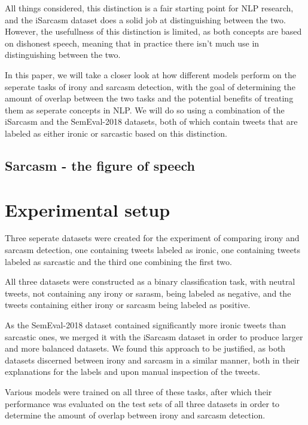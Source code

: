 \documentclass[10pt, a4paper]{article}
\begin{document}
All things considered, this distinction is a fair starting point for NLP research, and the iSarcasm \citep{iSarcasm} dataset
does a solid job at distinguishing between the two. However, the usefullness of this distinction is limited, as both concepts
are based on dishonest speech, meaning that in practice there isn't much use in distinguishing between the two.

In this paper, we will take a closer look at how different models perform on the seperate tasks of irony and sarcasm detection,
with the goal of determining the amount of overlap between the two tasks and the potential benefits of treating them as seperate
concepts in NLP. We will do so using a combination of the iSarcasm \citep{iSarcasm} and the SemEval-2018 \citep{semeval-2018} 
datasets, both of which contain tweets that are labeled as either ironic or sarcastic based on this distinction.

\subsection{Sarcasm - the figure of speech}

\section{Experimental setup}

Three seperate datasets were created for the experiment of comparing irony and sarcasm detection, one containing tweets labeled
as ironic, one containing tweets labeled as sarcastic and the third one combining the first two.

All three datasets were constructed as a binary classification task, with neutral tweets, not containing any irony or sarasm,
being labeled as negative, and the tweets containing either irony or sarcasm being labeled as positive.

As the SemEval-2018 dataset contained significantly more
ironic tweets than sarcastic ones, we merged it with the iSarcasm dataset in order to produce larger and more balanced datasets.
We found this approach to be justified, as both datasets discerned between irony and sarcasm in a similar manner, both in
their explanations for the labels and upon manual inspection of the tweets. 

Various models were trained on all three of these tasks, after which their performance was evaluated on the test sets of all
three datasets in order to determine the amount of overlap between irony and sarcasm detection.
\end{document}

